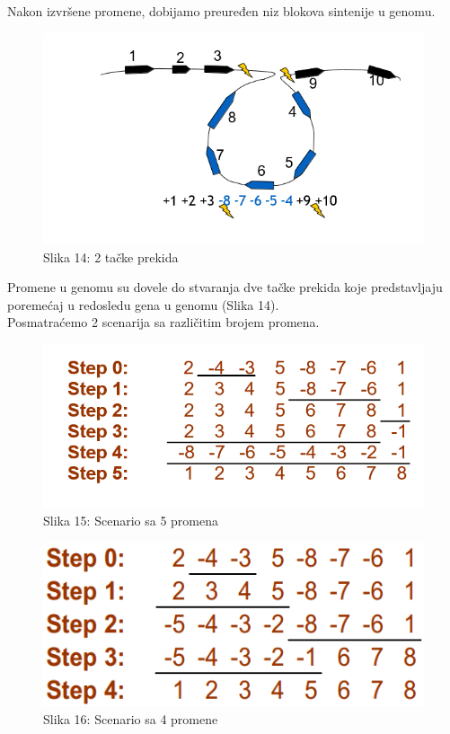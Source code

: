 \documentclass{article}
\begin{document}
\noindent Nakon izvršene promene, dobijamo preuređen niz blokova sintenije u genomu.\\

\begin{figure}[h!]
\centering
\includegraphics[scale=0.5]{slike/promene4.PNG}
\caption{Slika 14: 2 tačke prekida}
\label{slika:X}
\end{figure}

\noindent Promene u genomu su dovele do stvaranja dve tačke prekida koje predstavljaju poremećaj u redosledu gena u genomu (Slika 14).\\

\noindent Posmatraćemo 2 scenarija sa različitim brojem promena.\\

\begin{figure}[h!]
\centering
\includegraphics[scale=0.6]{slike/scenario5.PNG}
\caption{Slika 15: Scenario sa 5 promena}
\label{slika:X}
\end{figure}

\begin{figure}[h!]
\centering
\includegraphics[scale=0.7]{slike/scenario4.PNG}
\caption{Slika 16: Scenario sa 4 promene}
\label{slika:X}
\end{figure}
\end{document}
